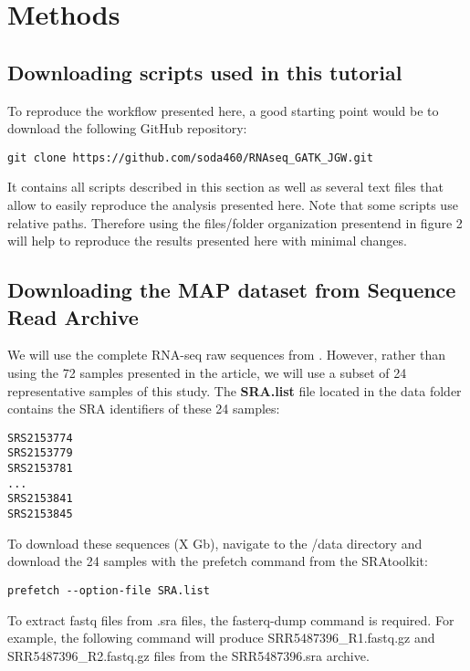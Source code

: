

\section{Methods}

\subsection{Downloading scripts used in this tutorial}

To reproduce the workflow presented here, a good starting point would be to download the following GitHub repository:

\begin{verbatim}
git clone https://github.com/soda460/RNAseq_GATK_JGW.git
\end{verbatim}

It contains all scripts described in this section as well as several text files that allow to easily reproduce the analysis presented here. Note that some scripts use relative paths. Therefore using the files/folder organization presentend in figure 2 will help to reproduce the results presented here with minimal changes.




\subsection{Downloading the MAP dataset from Sequence Read Archive}

We will use the complete RNA-seq raw sequences from \citep{Ariel2021}. However, rather than using the 72 samples presented in the article, we will use a subset of 24 representative samples of this study. The \textbf{SRA.list} file located in the data folder contains the SRA identifiers of these 24 samples:

\begin{verbatim}
SRS2153774
SRS2153779
SRS2153781
...
SRS2153841
SRS2153845
\end{verbatim}


To download these sequences (X Gb), navigate to the /data directory and download the 24 samples with the prefetch command from the SRAtoolkit:

\begin{verbatim}
prefetch --option-file SRA.list
\end{verbatim}

To extract fastq files from .sra files, the fasterq-dump command is required. For example, the following command will produce SRR5487396\_R1.fastq.gz and SRR5487396\_R2.fastq.gz files from the SRR5487396.sra archive.

